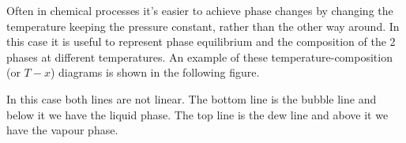 \documentclass[12pt,a4paper]{report}
\begin{document}
   Often in chemical processes it's easier to achieve phase changes by changing the temperature keeping the pressure constant, rather than the other way around. In this case it is useful to represent phase equilibrium and the composition of the 2 phases at different temperatures. An example of these temperature-composition (or $T-x$) diagrams is shown in the following figure. 
   \begin{center}
   \end{center}
   
   In this case both lines are not linear. The bottom line is the bubble line and below it we have the liquid phase. The top line is the dew line and above it we have the vapour phase.
\end{document}
